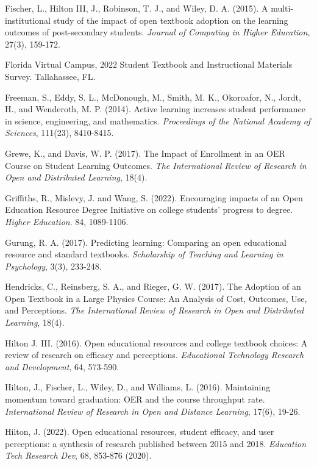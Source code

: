 \documentclass[11pt]{article}
\newcommand{\alink}[2]{\href{#1}{\textcolor{blue}{#2}}}
\begin{document}
\begin{thebibliography}{99}
   Fischer, L., Hilton III, J., Robinson, T. J., and Wiley, D.
  A. (2015). A multi-institutional study of the impact of open textbook adoption on the learning outcomes of post-secondary students. {\em Journal of Computing in Higher Education}, 27(3), 159-172.

   Florida Virtual Campus, 2022 Student Textbook and Instructional Materials Survey. Tallahassee, FL. %

   Freeman, S., Eddy, S. L., McDonough, M., Smith, M. K., Okoroafor, N., Jordt, H., and Wenderoth, M. P. (2014). Active learning increases student performance in science, engineering, and mathematics. {\em Proceedings of the National Academy of Sciences}, 111(23), 8410-8415.

   Grewe, K., and Davis, W. P. (2017). The Impact of Enrollment in an OER Course on Student Learning Outcomes. {\em The International Review of Research in Open and Distributed Learning}, 18(4).

   Griffiths, R., Mislevy, J. and Wang, S. (2022). Encouraging impacts of an Open Education Resource Degree Initiative on college students’ progress to degree. {\em Higher Education}. 84, 1089-1106.

   Gurung, R. A. (2017). Predicting learning: Comparing an open educational resource and standard textbooks. {\em Scholarship of Teaching and Learning in Psychology}, 3(3), 233-248.

   Hendricks, C., Reinsberg, S. A., and Rieger, G. W. (2017). The Adoption of an Open Textbook in a Large Physics Course: An Analysis of Cost, Outcomes, Use, and Perceptions. {\em The International Review of Research in Open and Distributed Learning}, 18(4).

   Hilton J. III. (2016). Open educational resources and college textbook choices: A review of research on efficacy and perceptions. {\em Educational Technology Research and Development}, 64, 573-590.

   Hilton, J., Fischer, L., Wiley, D., and Williams, L. (2016). Maintaining momentum toward graduation: OER and the course throughput rate. {\em International Review of Research in Open and Distance Learning}, 17(6), 19-26.

   Hilton, J. (2022). Open educational resources, student efficacy, and user perceptions: a synthesis of research published between 2015 and 2018. {\em Education Tech Research Dev}, 68, 853-876 (2020).%


\end{thebibliography}
\end{document}
